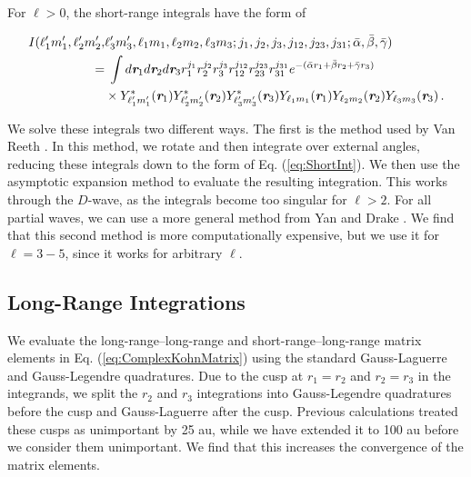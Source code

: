 \documentclass[preprint,showpacs,showkeys,preprintnumbers,amsmath,amssymb,longbibliography,pra,aps]{revtex4-1}
\begin{document}
For $\ell > 0$, the short-range integrals have the form of
\begin{widetext}
\begin{align}
\label{eq:ShortIntGen}
\nonumber I(\ell_1^\prime m_1^\prime, \ell_2^\prime m_2^\prime, &\ell_3^\prime m_3^\prime, \ell_1 m_1, \ell_2 m_2, \ell_3 m_3; j_1,j_2,j_3,j_{12},j_{23},j_{31}; \bar{\alpha}, \bar{\beta}, \bar{\gamma}) \\
= & \; \int d \textit{\textbf{r}}_1 d \textit{\textbf{r}}_2 d \textit{\textbf{r}}_3
r_1^{j_1} r_2^{j_2} r_3^{j_3} r_{12}^{j_{12}}
r_{23}^{j_{23}} r_{31}^{j_{31}}
e^{-(\bar{\alpha} r_1 + \bar{\beta} r_2 + \bar{\gamma} r_3)}  \nonumber \\
& \times Y_{\ell_1^\prime m_1^\prime}^* (\textit{\textbf{r}}_1) Y_{\ell_2^\prime m_2^\prime}^* (\textit{\textbf{r}}_2) Y_{\ell_3^\prime m_3^\prime}^* (\textit{\textbf{r}}_3) Y_{\ell_1 m_1} (\textit{\textbf{r}}_1) Y_{\ell_2 m_2} (\textit{\textbf{r}}_2) Y_{\ell_3 m_3} (\textit{\textbf{r}}_3)\, .
\end{align}
\end{widetext}
We solve these integrals two different ways.
The first is the method used by Van Reeth \cite{VanReethThesis}. In this 
method, we rotate and then integrate over external angles, reducing these 
integrals down to the form of Eq. (\ref{eq:ShortInt}). We then use the 
asymptotic expansion method \cite{Drake1995} to evaluate the resulting
integration. This works through the 
$D$-wave, as the integrals become too singular for $\ell > 2$. For all partial 
waves, we can use a more general method from Yan and Drake \cite{Yan1997}. 
We find that this second method is more computationally expensive, but we use 
it for $\ell = 3 - 5$, since it works for arbitrary $\ell$. 

\subsection{Long-Range Integrations}
\label{sec:LongInt}
We evaluate the long-range--long-range and short-range--long-range matrix 
elements in Eq. (\ref{eq:ComplexKohnMatrix}) using the standard Gauss-Laguerre
and Gauss-Legendre quadratures. Due to the cusp at $r_1 = r_2$ and
$r_2 = r_3$ in the integrands, we split the $r_2$ and $r_3$ integrations into 
Gauss-Legendre quadratures before the cusp and Gauss-Laguerre after the cusp. 
Previous calculations \cite{VanReeth2003,VanReeth2004} treated these cusps as 
unimportant by 25 au, while we have extended it to 100 au before we consider 
them unimportant. We find that this increases the convergence of the matrix 
elements.
\end{document}
